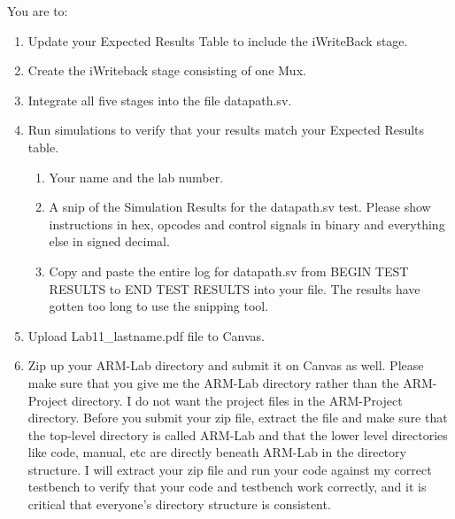 You are to:
\begin{enumerate}
\item Update your Expected Results Table to include the iWriteBack stage.
\item Create the iWriteback stage consisting of one Mux.
\item Integrate all five stages into the file datapath.sv.
\item Run simulations to verify that your results match your Expected Results table.   
	\begin{enumerate}
	\item Your name and the lab number.
	\item A snip of the Simulation Results for the datapath.sv test.  Please show instructions in hex, opcodes and control signals in binary and everything else in signed decimal.  
	\item Copy and paste the entire log for datapath.sv from BEGIN TEST RESULTS to END TEST RESULTS into your file.  The results have gotten too long to use the snipping tool.	
\end{enumerate}
\item Upload Lab11\_lastname.pdf file to Canvas.
\item Zip up your ARM-Lab directory and submit it on Canvas as well.  Please make sure that you give me the ARM-Lab directory rather than the ARM-Project directory.  I do not want the project files in the ARM-Project directory.  Before you submit your zip file, extract the file and make sure that the top-level directory is called ARM-Lab and that the lower level directories like code, manual, etc are directly beneath ARM-Lab in the directory structure.  I will extract your zip file and run your code against my correct testbench to verify that your code and testbench work correctly, and it is critical that everyone's directory structure is consistent.
\end{enumerate} 